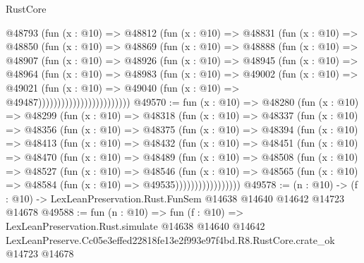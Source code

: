 \begin{lexlean}{RustCore}
\begin{coremodule}
                      @48793
                        (fun (x : @10) =>
                        @48812
                          (fun (x : @10) =>
                          @48831
                            (fun (x : @10) =>
                            @48850
                              (fun (x : @10) =>
                              @48869
                                (fun (x : @10) =>
                                @48888
                                  (fun (x : @10) =>
                                  @48907
                                    (fun (x : @10) =>
                                    @48926
                                      (fun (x : @10) =>
                                      @48945
                                        (fun (x : @10) =>
                                        @48964
                                          (fun (x : @10) =>
                                          @48983
                                            (fun (x : @10) =>
                                            @49002
                                              (fun (x : @10) =>
                                              @49021
                                                (fun (x : @10) =>
                                                @49040
                                                  (fun (x : @10) => @49487))))))))))))))))))))))))
@49570 := fun (x : @10) =>
  @48280
    (fun (x : @10) =>
    @48299
      (fun (x : @10) =>
      @48318
        (fun (x : @10) =>
        @48337
          (fun (x : @10) =>
          @48356
            (fun (x : @10) =>
            @48375
              (fun (x : @10) =>
              @48394
                (fun (x : @10) =>
                @48413
                  (fun (x : @10) =>
                  @48432
                    (fun (x : @10) =>
                    @48451
                      (fun (x : @10) =>
                      @48470
                        (fun (x : @10) =>
                        @48489
                          (fun (x : @10) =>
                          @48508
                            (fun (x : @10) =>
                            @48527
                              (fun (x : @10) =>
                              @48546
                                (fun (x : @10) =>
                                @48565
                                  (fun (x : @10) => @48584 (fun (x : @10) => @49535)))))))))))))))))
@49578 := (n : @10) ->
  (f : @10) -> LexLeanPreservation.Rust.FunSem @14638 @14640 @14642 @14723 @14678
@49588 := fun (n : @10) =>
  fun (f : @10) =>
  LexLeanPreservation.Rust.simulate
    @14638
    @14640
    @14642
    LexLeanPreserve.Cc05e3effed22818fe13e2f993e97f4bd.R8.RustCore.crate_ok
    @14723
    @14678
\end{coremodule}
\end{lexlean}
